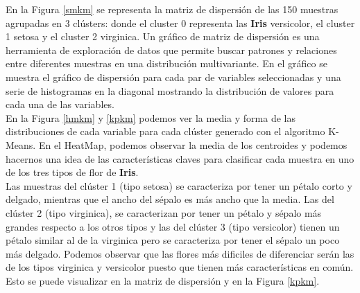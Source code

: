 \documentclass[a4paper, 20pt]{article}
\begin{document}
En la Figura \ref{smkm} se representa la matriz de dispersión de las 150 muestras agrupadas en 3 clústers: donde el cluster 0 representa las \textbf{Iris} versicolor, el cluster 1 setosa y el cluster 2 virginica. Un gráfico de matriz de dispersión es una herramienta de exploración de datos que permite buscar patrones y relaciones entre diferentes muestras en una distribución multivariante. En el gráfico se muestra el gráfico de dispersión para cada par de variables seleccionadas y una serie de histogramas en la diagonal mostrando la distribución de valores para cada una de las variables.\\

En la Figura \ref{hmkm} y \ref{kpkm} podemos ver la media y forma de las distribuciones de cada variable para cada clúster generado con el algoritmo K-Means. En el HeatMap, podemos observar la media de los centroides y podemos hacernos una idea de las características claves para clasificar cada muestra en uno de los tres tipos de flor de \textbf{Iris}.\\

Las muestras del clúster 1 (tipo setosa) se caracteriza por tener un pétalo corto y delgado, mientras que el ancho del sépalo es más ancho que la media. Las del clúster 2 (tipo virginica), se caracterizan por tener un pétalo y sépalo más grandes respecto a los otros tipos y las del clúster 3 (tipo versicolor) tienen un pétalo similar al de la virginica pero se caracteriza por tener el sépalo un poco más delgado. Podemos observar que las flores más dificiles de diferenciar serán las de los tipos virginica y versicolor puesto que tienen más características en común. Esto se puede visualizar en la matriz de dispersión y en la Figura \ref{kpkm}.
\end{document}
